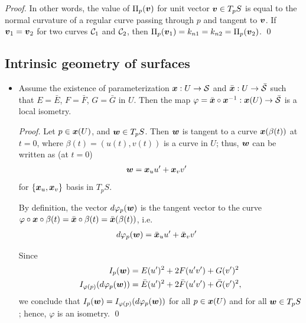 \documentclass[11pt]{article}
\begin{document}
\begin{itemize}
\begin{proof}
In other words, the value of $\Pi_{p}(\boldsymbol{v})$ for unit vector $\boldsymbol{v}\in T_{p}S$ is equal to the normal curvature of a regular curve passing through $p$ and tangent to $\boldsymbol{v}$. If $\boldsymbol{v}_{1} = \boldsymbol{v}_{2}$ for two curves ${\mathcal C}_{1}$ and ${\mathcal C}_{2}$, then $\Pi_{p}(\boldsymbol{v}_{1}) = k_{n1} = k_{n2} = \Pi_{p}(\boldsymbol{v}_{2})$. \qed
\end{proof}\vspace{15pt}
\end{itemize}

\subsection{Intrinsic geometry of surfaces}
\begin{itemize}
\item \begin{proposition}\label{prop: local_iso}
Assume the existence of parameterization $\boldsymbol{x}: U\rightarrow {\mathcal S}$ and $\bar{\boldsymbol{x}}: U\rightarrow \bar{{\mathcal S}}$ such that $E=\bar{E}$, $F=\bar{F}$, $G=\bar{G}$ in $U$. Then the map $\varphi= \bar{\boldsymbol{x}}\circ \boldsymbol{x}^{-1}:  \boldsymbol{x}(U) \rightarrow \bar{{\mathcal S}}$ is a local isometry. 
\end{proposition}
\begin{proof}
Let $p\in \boldsymbol{x}(U)$, and $\boldsymbol{w}\in T_{p}S$. Then  $\boldsymbol{w}$ is tangent to a curve $\boldsymbol{x}(\beta(t))$ at $t=0$, where $\beta(t) = (u(t), v(t))$ is a curve in $U$; thus, $\boldsymbol{w}$ can be written as (at $t=0$)
\begin{align*}
\boldsymbol{w} &= \boldsymbol{x}_{u}u' + \boldsymbol{x}_{v}v'
\end{align*} for $\left\{\boldsymbol{x}_{u}, \boldsymbol{x}_{v}\right\}$ basis in $T_{p}S$.

By definition, the vector $d\varphi_{p}(\boldsymbol{w})$ is the tangent vector to the curve $\varphi\circ \boldsymbol{x}\circ\beta(t) = \bar{\boldsymbol{x}}\circ\beta(t) = \bar{\boldsymbol{x}}(\beta(t))$, i.e. 
\begin{align*}
d\varphi_{p}(\boldsymbol{w}) &= \bar{\boldsymbol{x}}_{u}u' + \bar{\boldsymbol{x}}_{v}v'
\end{align*}

Since 
\begin{align*}
I_{p}(\boldsymbol{w}) &= E(u')^{2} + 2F(u'v')+ G(v')^{2}\\
I_{\varphi(p)}(d\varphi_{p}(\boldsymbol{w}))&= \bar{E}(u')^{2} + 2\bar{F}(u'v')+ \bar{G}(v')^{2}, 
\end{align*}
we conclude that $I_{p}(\boldsymbol{w})  = I_{\varphi(p)}(d\varphi_{p}(\boldsymbol{w}))$ for all $p\in \boldsymbol{x}(U)$ and for all $\boldsymbol{w}\in T_{p}S$; hence, $\varphi$ is an isometry. \qed
\end{proof}\vspace{15pt}



\end{itemize}
\end{document}
